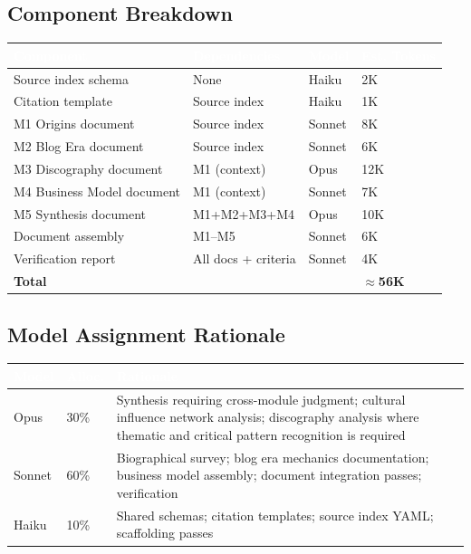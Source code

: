 \documentclass[11pt,letterpaper]{article}
\newcommand{\tableheader}[1]{\textbf{\sffamily\textcolor{white}{#1}}}
\begin{document}
\subsection{Component Breakdown}

\begin{center}
\begin{tabularx}{\textwidth}{L{3cm}L{3.5cm}C{1.5cm}C{2cm}}
\toprule
{}
\tableheader{Component} & \tableheader{Dependencies} & \tableheader{Model} & \tableheader{Est. Tokens} \\
\midrule
Source index schema & None & Haiku & 2K \\
Citation template & Source index & Haiku & 1K \\
M1 Origins document & Source index & Sonnet & 8K \\
M2 Blog Era document & Source index & Sonnet & 6K \\
M3 Discography document & M1 (context) & Opus & 12K \\
M4 Business Model document & M1 (context) & Sonnet & 7K \\
M5 Synthesis document & M1+M2+M3+M4 & Opus & 10K \\
Document assembly & M1–M5 & Sonnet & 6K \\
Verification report & All docs + criteria & Sonnet & 4K \\
\midrule
\textbf{Total} & & & \textbf{$\approx$56K} \\
\bottomrule
\end{tabularx}
\end{center}

\subsection{Model Assignment Rationale}

\begin{center}
\begin{tabularx}{\textwidth}{L{2cm}C{1.5cm}X}
\toprule
{}
\tableheader{Model} & \tableheader{Alloc.} & \tableheader{Rationale} \\
\midrule
Opus & 30\% & Synthesis requiring cross-module judgment; cultural influence network analysis; discography analysis where thematic and critical pattern recognition is required \\
Sonnet & 60\% & Biographical survey; blog era mechanics documentation; business model assembly; document integration passes; verification \\
Haiku & 10\% & Shared schemas; citation templates; source index YAML; scaffolding passes \\
\bottomrule
\end{tabularx}
\end{center}
\end{document}
